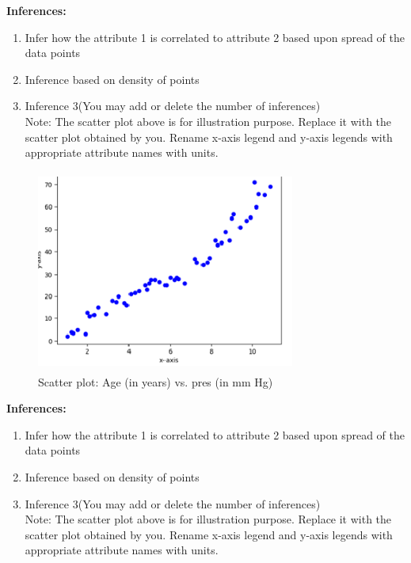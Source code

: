 \documentclass[12 pt, a4paper]{article}
\theoremstyle{definition}
\begin{document}
\textbf{\Large Inferences:}
\begin{enumerate}
   \item Infer how the attribute 1 is correlated to attribute 2 based upon spread of the data points
   \item Inference based on density of points
   \item Inference 3(You may add or delete the number of inferences)
\\Note: The scatter plot above is for illustration purpose. Replace it with the scatter plot obtained by you. Rename x-axis legend and y-axis legends with appropriate attribute names with units.

\end{enumerate}

\begin{figure}[H]
	\centering
	\includegraphics[width=8.5cm,height=6.65cm]{Scatter Plot.png}
	\caption{Scatter plot: Age (in years) vs. pres (in mm Hg)}
	\label{Blockdia}
\end{figure}

\textbf{\Large Inferences:}
\begin{enumerate}
   \item Infer how the attribute 1 is correlated to attribute 2 based upon spread of the data points
   \item Inference based on density of points
   \item Inference 3(You may add or delete the number of inferences)
\\Note: The scatter plot above is for illustration purpose. Replace it with the scatter plot obtained by you. Rename x-axis legend and y-axis legends with appropriate attribute names with units.

\end{enumerate}
\end{document}
